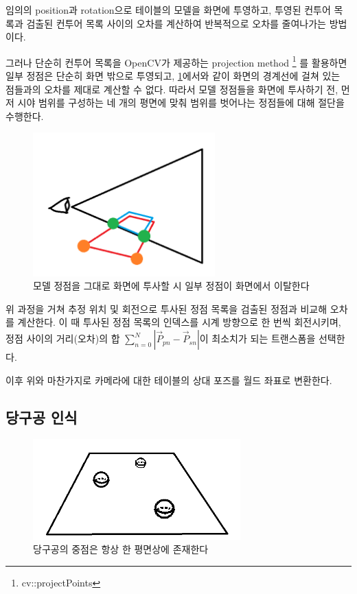 \documentclass[11pt]{oblivoir}
\begin{document}
임의의 position과 rotation으로 테이블의 모델을 화면에 투영하고, 투영된 컨투어 목록과 검출된 컨투어 목록 사이의 오차를 계산하여 반복적으로 오차를 줄여나가는 방법이다.

그러나 단순히 컨투어 목록을 OpenCV가 제공하는 projection method
\footnote{cv::projectPoints}
를 활용하면 일부 정점은 단순히 화면 밖으로 투영되고, \cref{fig;invalid-sight-projection}에서와 같이 화면의 경계선에 걸쳐 있는 점들과의 오차를 제대로 계산할 수 없다. 따라서 모델 정점들을 화면에 투사하기 전, 먼저 시야 범위를 구성하는 네 개의 평면에 맞춰 범위를 벗어나는 정점들에 대해 절단을 수행한다.

\begin{figure}[h]
        \centering
        \includegraphics[width=7cm]{img/sight-invalid-culling.png}
        \caption{모델 정점을 그대로 화면에 투사할 시 일부 정점이 화면에서 이탈한다}
        \label{fig;invalid-sight-projection}
\end{figure}

위 과정을 거쳐 추정 위치 및 회전으로 투사된 정점 목록을 검출된 정점과 비교해 오차를 계산한다. 이 때  투사된 정점 목록의 인덱스를 시계 방향으로 한 번씩 회전시키며, 정점 사이의 거리(오차)의 합 $\sum_{n=0}^{N}|\vec{P}_{pn} - \vec{P}_{sn}|$이 최소치가 되는 트랜스폼을 선택한다.

이후 위와 마찬가지로 카메라에 대한 테이블의 상대 포즈를 월드 좌표로 변환한다.



\subsection{당구공 인식}

\begin{figure}[ht]
        \centering
        \includegraphics[width=8cm]{img/ball-recognition-introduce.png}
        \caption{당구공의 중점은 항상 한 평면상에 존재한다}
        \label{fig;ball-recognition-intro}
\end{figure}
\end{document}
